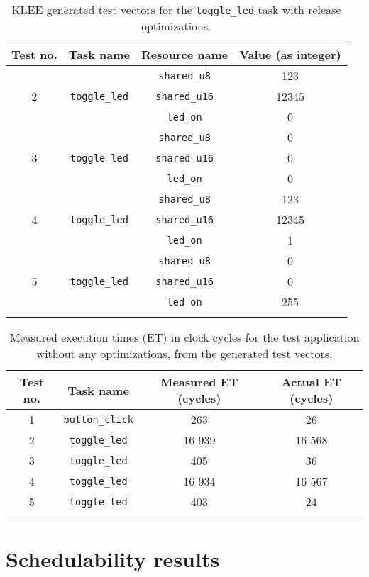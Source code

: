 \begin{longtable}{|c|c|c|c|}
\hline
Test no. & Task name & Resource name & Value (as integer) \\ \hline
\multirow{3}{*}{2} & \multirow{3}{*}{\texttt{toggle\_led}} & \texttt{shared\_u8}  & 123 \\ \cline{3-4} 
                   &                                       & \texttt{shared\_u16} & 12345 \\ \cline{3-4} 
                   &                                       & \texttt{led\_on}     & 0 \\ \hline
\multirow{3}{*}{3} & \multirow{3}{*}{\texttt{toggle\_led}} & \texttt{shared\_u8}  & 0 \\ \cline{3-4} 
                   &                                       & \texttt{shared\_u16} & 0 \\ \cline{3-4} 
                   &                                       & \texttt{led\_on}     & 0 \\ \hline
\multirow{3}{*}{4} & \multirow{3}{*}{\texttt{toggle\_led}} & \texttt{shared\_u8}  & 123 \\ \cline{3-4} 
                   &                                       & \texttt{shared\_u16} & 12345 \\ \cline{3-4} 
                   &                                       & \texttt{led\_on}     & 1 \\ \hline
\multirow{3}{*}{5} & \multirow{3}{*}{\texttt{toggle\_led}} & \texttt{shared\_u8}  & 0 \\ \cline{3-4} 
                   &                                       & \texttt{shared\_u16} & 0 \\ \cline{3-4} 
                   &                                       & \texttt{led\_on}     & 255 \\ \hline
\caption{KLEE generated test vectors for the \texttt{toggle\_led} task with release optimizations.}
\label{tab:evalreleaseteststoggle}
\end{longtable}

\begin{longtable}{|c | c | c | c|}
    \hline
    Test no. & Task name & Measured ET (cycles) & Actual ET (cycles) \\ [0.5ex]
    \hline
    1 & \texttt{button\_click} & 263 & 26 \\
    \hline
    2 & \texttt{toggle\_led} & 16 939 & 16 568 \\
    \hline
    3 & \texttt{toggle\_led} & 405 & 36 \\
    \hline
    4 & \texttt{toggle\_led} & 16 934 & 16 567 \\
    \hline
    5 & \texttt{toggle\_led} & 403 & 24 \\
    \hline
\caption{Measured execution times (ET) in clock cycles for the test application without any optimizations, from the generated test vectors.}
\label{tab:evalreleasemeasure}
\end{longtable}

\section{Schedulability results}
